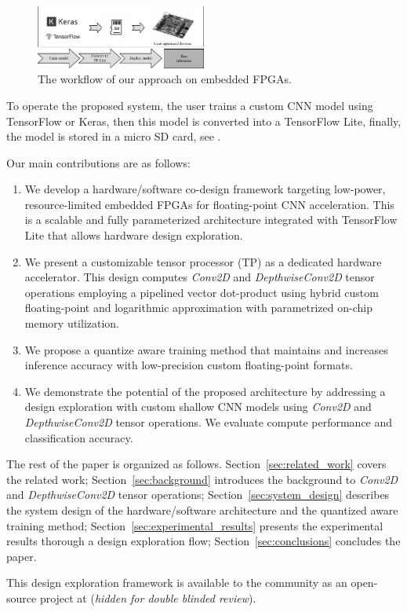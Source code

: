 \begin{figure}[t!]
	\centering
	\includegraphics[width=0.5\textwidth]{../figures/workflow.pdf}
	\caption{The workflow of our approach on embedded FPGAs.}
	\label{fig:workflow}
\end{figure}

To operate the proposed system, the user trains a custom CNN model using TensorFlow or Keras, then this model is converted into a TensorFlow Lite, finally, the model is stored in a micro SD card, see .

Our main contributions are as follows:
\begin{enumerate}
	\item We develop a hardware/software co-design framework targeting low-power, resource-limited embedded FPGAs for floating-point CNN acceleration. This is a scalable and fully parameterized architecture integrated with TensorFlow Lite that allows hardware design exploration.
	\item We present a customizable tensor processor (TP) as a dedicated hardware accelerator. This design computes \emph{Conv2D} and \emph{DepthwiseConv2D} tensor operations employing a pipelined vector dot-product using hybrid custom floating-point and logarithmic approximation with parametrized on-chip memory utilization.
	\item We propose a quantize aware training method that maintains and increases inference accuracy with low-precision custom floating-point formats.
	\item We demonstrate the potential of the proposed architecture by addressing a design exploration with custom shallow CNN models using \emph{Conv2D} and \emph{DepthwiseConv2D} tensor operations. We evaluate compute performance and classification accuracy.
\end{enumerate}

The rest of the paper is organized as follows. Section~\ref{sec:related_work} covers the related work; Section~\ref{sec:background} introduces the background to \emph{Conv2D} and \emph{DepthwiseConv2D} tensor operations; Section~\ref{sec:system_design} describes the system design of the hardware/software architecture and the quantized aware training method; Section~\ref{sec:experimental_results} presents the experimental results thorough a design exploration flow; Section~\ref{sec:conclusions} concludes the paper.

This design exploration framework is available to the community as an open-source project at (\emph{hidden for double blinded review}).